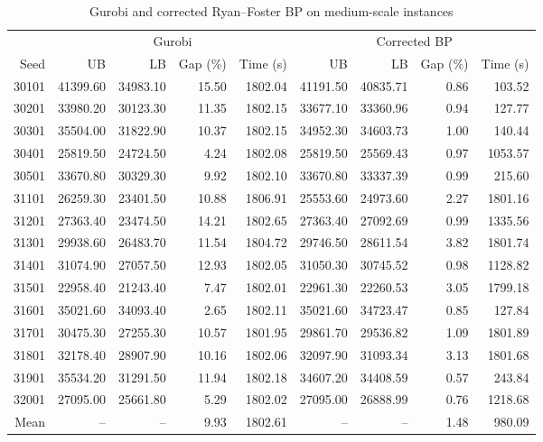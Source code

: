 \begin{table}[htbp]
\centering\small
\setlength{\tabcolsep}{3pt}
\caption{Gurobi and corrected Ryan--Foster BP on medium-scale instances}
\begin{tabular}{r*{8}{r}}
\toprule
 & \multicolumn{4}{c}{Gurobi} & \multicolumn{4}{c}{Corrected BP} \\
\cmidrule(lr){2-5}\cmidrule(lr){6-9}
Seed & UB & LB & Gap (\%) & Time (s) & UB & LB & Gap (\%) & Time (s) \\
\midrule
30101 & 41399.60 & 34983.10 & 15.50 & 1802.04 & 41191.50 & 40835.71 & 0.86 & 103.52 \\
30201 & 33980.20 & 30123.30 & 11.35 & 1802.15 & 33677.10 & 33360.96 & 0.94 & 127.77 \\
30301 & 35504.00 & 31822.90 & 10.37 & 1802.15 & 34952.30 & 34603.73 & 1.00 & 140.44 \\
30401 & 25819.50 & 24724.50 & 4.24 & 1802.08 & 25819.50 & 25569.43 & 0.97 & 1053.57 \\
30501 & 33670.80 & 30329.30 & 9.92 & 1802.10 & 33670.80 & 33337.39 & 0.99 & 215.60 \\
31101 & 26259.30 & 23401.50 & 10.88 & 1806.91 & 25553.60 & 24973.60 & 2.27 & 1801.16 \\
31201 & 27363.40 & 23474.50 & 14.21 & 1802.65 & 27363.40 & 27092.69 & 0.99 & 1335.56 \\
31301 & 29938.60 & 26483.70 & 11.54 & 1804.72 & 29746.50 & 28611.54 & 3.82 & 1801.74 \\
31401 & 31074.90 & 27057.50 & 12.93 & 1802.05 & 31050.30 & 30745.52 & 0.98 & 1128.82 \\
31501 & 22958.40 & 21243.40 & 7.47 & 1802.01 & 22961.30 & 22260.53 & 3.05 & 1799.18 \\
31601 & 35021.60 & 34093.40 & 2.65 & 1802.11 & 35021.60 & 34723.47 & 0.85 & 127.84 \\
31701 & 30475.30 & 27255.30 & 10.57 & 1801.95 & 29861.70 & 29536.82 & 1.09 & 1801.89 \\
31801 & 32178.40 & 28907.90 & 10.16 & 1802.06 & 32097.90 & 31093.34 & 3.13 & 1801.68 \\
31901 & 35534.20 & 31291.50 & 11.94 & 1802.18 & 34607.20 & 34408.59 & 0.57 & 243.84 \\
32001 & 27095.00 & 25661.80 & 5.29 & 1802.02 & 27095.00 & 26888.99 & 0.76 & 1218.68 \\
\midrule
Mean & -- & -- & 9.93 & 1802.61 & -- & -- & 1.48 & 980.09 \\
\bottomrule
\end{tabular}
\end{table}

